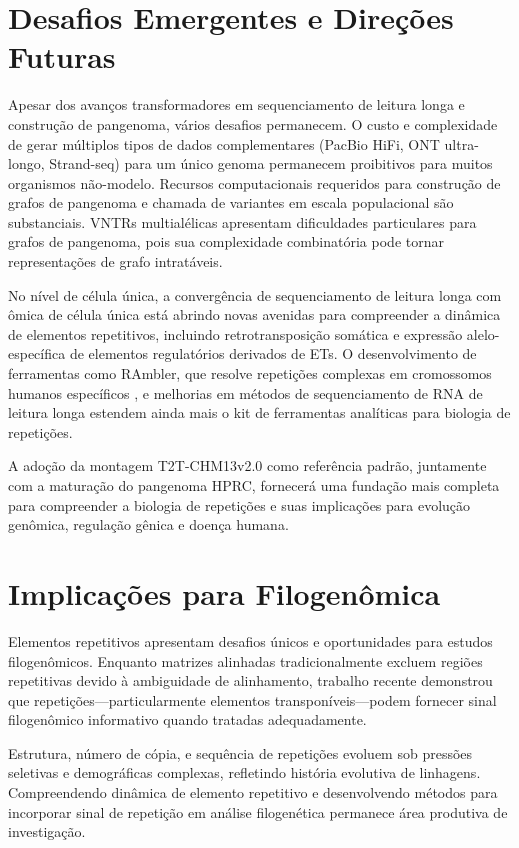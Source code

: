 \section{Desafios Emergentes e Direções Futuras}

Apesar dos avanços transformadores em sequenciamento de leitura longa e construção de pangenoma, vários desafios permanecem. O custo e complexidade de gerar múltiplos tipos de dados complementares (PacBio HiFi, ONT ultra-longo, Strand-seq) para um único genoma permanecem proibitivos para muitos organismos não-modelo. Recursos computacionais requeridos para construção de grafos de pangenoma e chamada de variantes em escala populacional são substanciais. VNTRs multialélicas apresentam dificuldades particulares para grafos de pangenoma, pois sua complexidade combinatória pode tornar representações de grafo intratáveis.

No nível de célula única, a convergência de sequenciamento de leitura longa com ômica de célula única está abrindo novas avenidas para compreender a dinâmica de elementos repetitivos, incluindo retrotransposição somática e expressão alelo-específica de elementos regulatórios derivados de ETs. O desenvolvimento de ferramentas como RAmbler, que resolve repetições complexas em cromossomos humanos específicos \parencite{chakravarty2025}, e melhorias em métodos de sequenciamento de RNA de leitura longa estendem ainda mais o kit de ferramentas analíticas para biologia de repetições.

A adoção da montagem T2T-CHM13v2.0 como referência padrão, juntamente com a maturação do pangenoma HPRC, fornecerá uma fundação mais completa para compreender a biologia de repetições e suas implicações para evolução genômica, regulação gênica e doença humana.

\section{Implicações para Filogenômica}

Elementos repetitivos apresentam desafios únicos e oportunidades para estudos filogenômicos. Enquanto matrizes alinhadas tradicionalmente excluem regiões repetitivas devido à ambiguidade de alinhamento, trabalho recente demonstrou que repetições---particularmente elementos transponíveis---podem fornecer sinal filogenômico informativo quando tratadas adequadamente.

Estrutura, número de cópia, e sequência de repetições evoluem sob pressões seletivas e demográficas complexas, refletindo história evolutiva de linhagens. Compreendendo dinâmica de elemento repetitivo e desenvolvendo métodos para incorporar sinal de repetição em análise filogenética permanece área produtiva de investigação.

